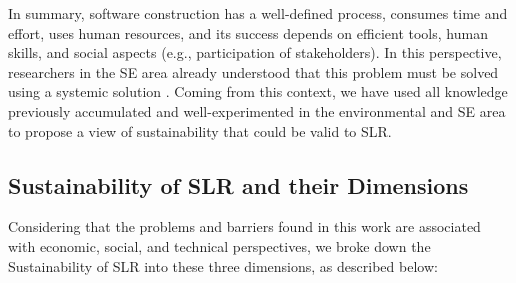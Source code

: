 \documentclass{article}
\begin{document}
In summary, software construction has a well-defined process, consumes time and effort, uses human resources, and its success depends on efficient tools, human skills, and social aspects (e.g., participation of stakeholders). In this perspective, researchers in the SE area already understood that this problem must be solved using a systemic solution \cite{Becker2015Sustainability}. Coming from this context, we have used all knowledge previously accumulated and well-experimented in the environmental and SE area to propose a view of sustainability that could be valid to SLR.

\subsection{Sustainability of SLR and their Dimensions}








Considering that the problems and barriers found in this work are associated with economic, social, and technical perspectives, we broke down the Sustainability of SLR into these three dimensions, as described below: 
\end{document}
